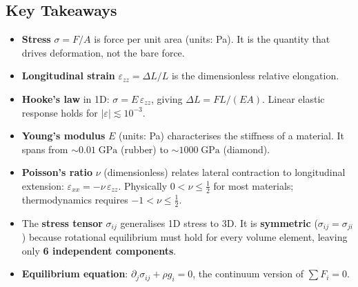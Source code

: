 \subsection*{Key Takeaways}
\label{subsec:lec02:takeaways}

\begin{itemize}
    \item \textbf{Stress} $\sigma = F/A$ is force per unit area
          (units: Pa).  It is the quantity that drives deformation, not
          the bare force.
    \item \textbf{Longitudinal strain} $\varepsilon_{zz} = \Delta L / L$
          is the dimensionless relative elongation.
    \item \textbf{Hooke's law} in 1D: $\sigma = E\,\varepsilon_{zz}$,
          giving $\Delta L = FL / (EA)$.  Linear elastic response holds
          for $|\varepsilon| \lesssim 10^{-3}$.
    \item \textbf{Young's modulus} $E$ (units: Pa) characterises the
          stiffness of a material.  It spans from $\sim 0.01\;\text{GPa}$
          (rubber) to $\sim 1000\;\text{GPa}$ (diamond).
    \item \textbf{Poisson's ratio} $\nu$ (dimensionless) relates lateral
          contraction to longitudinal extension:
          $\varepsilon_{xx} = -\nu\,\varepsilon_{zz}$.
          Physically $0 < \nu \leq \tfrac{1}{2}$ for most materials;
          thermodynamics requires $-1<\nu\leq\tfrac{1}{2}$.
    \item The \textbf{stress tensor} $\sigma_{ij}$ generalises 1D stress
          to 3D.  It is \textbf{symmetric} ($\sigma_{ij}=\sigma_{ji}$)
          because rotational equilibrium must hold for every volume element,
          leaving only \textbf{6 independent components}.
    \item \textbf{Equilibrium equation}:
          $\partial_j\sigma_{ij} + \rho g_i = 0$, the continuum version
          of $\sum F_i = 0$.
\end{itemize}

